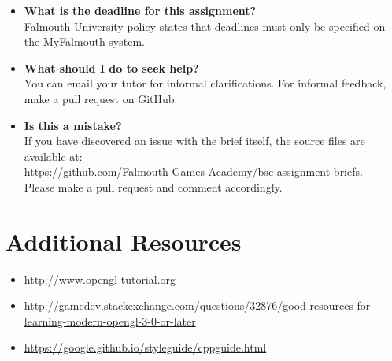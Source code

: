 \documentclass{../../fal_assignment}
\begin{document}
\begin{itemize}
	\item 	\textbf{What is the deadline for this assignment?} \\ 
    		Falmouth University policy states that deadlines must only be specified on the MyFalmouth system.
    		
	\item 	\textbf{What should I do to seek help?} \\ 
    		You can email your tutor for informal clarifications. For informal feedback, make a pull request on GitHub. 
    		
    	\item 	\textbf{Is this a mistake?} \\ 	
    		If you have discovered an issue with the brief itself, the source files are available at: \\
    		\url{https://github.com/Falmouth-Games-Academy/bsc-assignment-briefs}.\\
    		 Please make a pull request and comment accordingly.
\end{itemize}

\section*{Additional Resources}

\begin{itemize}
    \item \url{http://www.opengl-tutorial.org}
    \item \url{http://gamedev.stackexchange.com/questions/32876/good-resources-for-learning-modern-opengl-3-0-or-later}
    \item \url{https://google.github.io/styleguide/cppguide.html}
\end{itemize}
\end{document}
